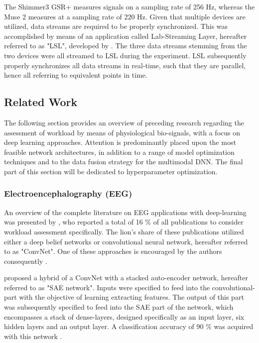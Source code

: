 \documentclass[12pt]{article}
\begin{document}
The Shimmer3 GSR+ measures signals on a sampling rate of 256 Hz, whereas the Muse 2 measures at a sampling rate of 220 Hz. Given that multiple devices are utilized, data streams are required to be properly synchronized. This was accomplished by means of an application called Lab-Streaming Layer, hereafter referred to as "LSL", developed by . The three data streams stemming from the two devices were all streamed to LSL during the experiment. LSL subsequently properly synchronizes all data streams in real-time,  such that they are parallel, hence all referring to equivalent points in time. 

\subsection{Related Work} 
The following section provides an overview of preceding research regarding the assessment of workload by means of physiological bio-signals, with a focus on deep learning approaches. Attention is predominantly placed upon the most feasible network architectures, in addition to a range of model optimization techniques and to the data fusion strategy for the multimodal DNN. The final part of this section will be dedicated to hyperparameter optimization.  

\subsubsection{Electroencephalography (EEG)}
An overview of the complete literature on EEG applications with deep-learning was presented by , who reported a total of 16 \% of all publications to consider workload assessment specifically. The lion's share of these publications utilized either a deep belief networks or convolutional neural network, hereafter referred to as "ConvNet". One of these approaches is encouraged by the authors consequently \cite{craik2019deep}.

 proposed a hybrid of a ConvNet with a stacked auto-encoder network, hereafter referred to as "SAE network". Inputs were specified to feed into the convolutional-part with the objective of learning extracting features. The output of this part was subsequently specified to feed into the SAE part of the network,  which encompasses a stack of dense-layers, designed specifically as an input layer, six hidden layers and an output layer. A classification accuracy of 90 \% was acquired with this network \cite{tabar2016novel}. 
\end{document}
